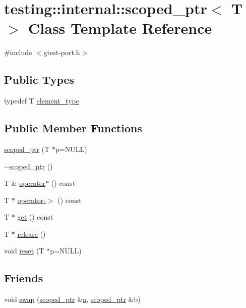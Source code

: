 \hypertarget{classtesting_1_1internal_1_1scoped__ptr}{}\section{testing\+:\+:internal\+:\+:scoped\+\_\+ptr$<$ T $>$ Class Template Reference}
\label{classtesting_1_1internal_1_1scoped__ptr}


{\ttfamily \#include $<$gtest-\/port.\+h$>$}

\subsection*{Public Types}
\begin{DoxyCompactItemize}
\item 
typedef T \hyperlink{classtesting_1_1internal_1_1scoped__ptr_ae755ffeebada8e20b68c1d1ffa91cf13}{element\+\_\+type}
\end{DoxyCompactItemize}
\subsection*{Public Member Functions}
\begin{DoxyCompactItemize}
\item 
\hyperlink{classtesting_1_1internal_1_1scoped__ptr_adb972432999a0c63720df148964ac2a5}{scoped\+\_\+ptr} (T $\ast$p=N\+U\+LL)
\item 
\hyperlink{classtesting_1_1internal_1_1scoped__ptr_ab721de9bf4369f002fb563e82352ee36}{$\sim$scoped\+\_\+ptr} ()
\item 
T \& \hyperlink{classtesting_1_1internal_1_1scoped__ptr_ab197837f87062de69d9d6e04539bbabe}{operator$\ast$} () const 
\item 
T $\ast$ \hyperlink{classtesting_1_1internal_1_1scoped__ptr_adc38310fbbe400faf9279e36000a17c4}{operator-\/$>$} () const 
\item 
T $\ast$ \hyperlink{classtesting_1_1internal_1_1scoped__ptr_adc8f8fcb63ce69f80f011456e6d2f08d}{get} () const 
\item 
T $\ast$ \hyperlink{classtesting_1_1internal_1_1scoped__ptr_a7a4f3e568d81a5d8bcb5f8d6bf5130b1}{release} ()
\item 
void \hyperlink{classtesting_1_1internal_1_1scoped__ptr_acac03266a43359801aff0de5c990bec0}{reset} (T $\ast$p=N\+U\+LL)
\end{DoxyCompactItemize}
\subsection*{Friends}
\begin{DoxyCompactItemize}
\item 
void \hyperlink{classtesting_1_1internal_1_1scoped__ptr_a01bc0441e6a3ebf26807ac523392ca86}{swap} (\hyperlink{classtesting_1_1internal_1_1scoped__ptr}{scoped\+\_\+ptr} \&\hyperlink{_07copy_08_2_read_camera_model_8m_a551a3d351eadcc0b9b1a2f24f0fb5ea0}{a}, \hyperlink{classtesting_1_1internal_1_1scoped__ptr}{scoped\+\_\+ptr} \&b)
\end{DoxyCompactItemize}



